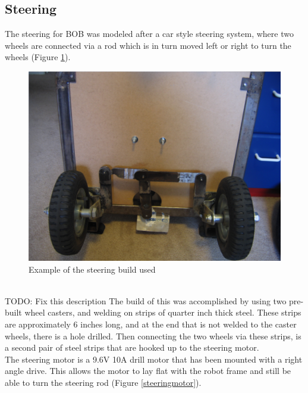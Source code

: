 \documentclass{article}
\begin{document}
\subsection{Steering}
The steering for BOB was modeled after a car style steering system, where two wheels are connected via a rod which is in turn moved left or right to turn the wheels (Figure \ref{steering}).
\begin{figure}[htp]
  \begin{center}
\includegraphics[scale=0.25]{steering}
  \end{center}
  \caption{Example of the steering build used}
\label{steering}
\end{figure}\\
TODO: Fix this description
The build of this was accomplished by using two pre-built wheel casters, and welding on strips of quarter inch thick steel. These strips are approximately 6 inches long, and at the end that is not welded to the caster wheels, there is a hole drilled. Then connecting the two wheels via these strips, is a second pair of steel strips that are hooked up to the steering motor.\\
The steering motor is a 9.6V 10A drill motor that has been mounted with a right angle drive. This allows the motor to lay flat with the robot frame and still be able to turn the steering rod (Figure \ref{steeringmotor}).
\end{document}
